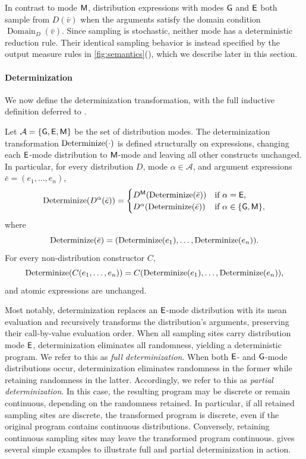 In contrast to mode $\mathsf{M}$, distribution expressions with modes $\mathsf{G}$ and $\mathsf{E}$ both sample from
$D(\bar v)$ when the arguments satisfy the domain condition $\operatorname{Domain}_D(\bar v)$.
Since sampling is stochastic, neither mode has a deterministic reduction
rule. Their identical sampling behavior is instead specified by the
output measure rules in
\cref{fig:semantics}(), which we describe
later in this section.



\paragraph{Determinization} We now define the determinization transformation, with the full inductive definition deferred to . 

\begin{definition}
\label{def:determinization}
Let $\mathcal{A}=\{\mathsf{G},\mathsf{E},\mathsf{M}\}$ be the set of distribution modes. The
determinization transformation $\operatorname{Determinize}(\cdot)$ is defined structurally on
expressions, changing each $\mathsf{E}$-mode distribution to $\mathsf{M}$-mode and leaving all other constructs unchanged. In particular, for
every distribution $D$, mode $\alpha\in\mathcal{A}$, and argument
expressions $\bar e=(e_1,\ldots,e_n)$,
\[
\operatorname{Determinize}(D^\alpha(\bar e))
=
\begin{cases}
D^{\mathsf{M}}(\operatorname{Determinize}(\bar e)) & \text{if } \alpha=\mathsf{E},\\
D^\alpha(\operatorname{Determinize}(\bar e)) & \text{if } \alpha\in\{\mathsf{G},\mathsf{M}\},
\end{cases}
\]
where
\[
\operatorname{Determinize}(\bar e)
=
(\operatorname{Determinize}(e_1),\ldots,\operatorname{Determinize}(e_n)).
\]
For every non-distribution constructor $C$,
\[
\operatorname{Determinize}(C(e_1,\ldots,e_n))
=
C(\operatorname{Determinize}(e_1),\ldots,\operatorname{Determinize}(e_n)),
\]
and atomic expressions are unchanged.
\end{definition}

Most notably, determinization replaces an $\mathsf{E}$-mode distribution with its mean evaluation and recursively transforms the distribution's arguments, preserving their call-by-value evaluation order. When all sampling sites carry distribution mode $\mathsf{E}$, determinization eliminates all randomness, yielding a deterministic program. We refer to this as \emph{full determinization}. When both $\mathsf{E}$- and $\mathsf{G}$-mode distributions occur, determinization eliminates randomness in the former while retaining randomness in the latter. Accordingly, we refer to this as \emph{partial determinization}. In this case, the resulting program may be discrete or remain continuous, depending on the randomness retained. In particular, if all retained sampling sites are discrete, the transformed program is discrete, even if the original program contains continuous distributions. Conversely, retaining continuous sampling sites may leave the transformed program continuous.  gives several simple examples to illustrate full and partial determinization in action.

